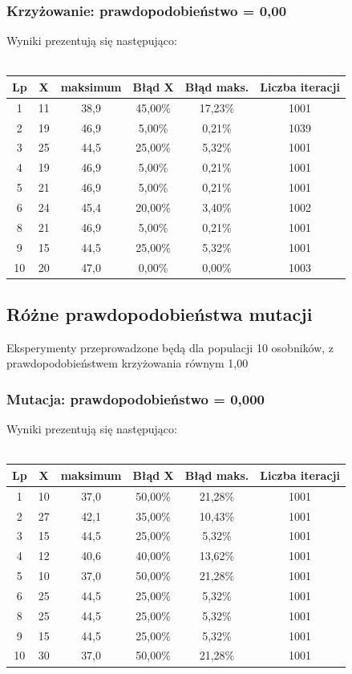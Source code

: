 \documentclass[a4paper,11pt]{article}
\begin{document}
				\subsubsection{Krzyżowanie: prawdopodobieństwo = 0,00}
					Wyniki prezentują się następująco:\\~\\
					\begin{tabular}{|c|c|c|c|c|c|}
						\hline 
						Lp & X & maksimum & Błąd X & Błąd maks. & Liczba iteracji\\
						\hline
						1 & 11 & 38,9 & 45,00\% & 17,23\% & 1001 \\\hline
						2 & 19 & 46,9 & 5,00\% & 0,21\%& 1039 \\\hline
						3 & 25 & 44,5 & 25,00\% &5,32\% &1001 \\\hline
						4 & 19 & 46,9 & 5,00\% &0,21\% &1001 \\\hline
						5 & 21 & 46,9 & 5,00\% &0,21\% &1001 \\\hline
						6 & 24 & 45,4 & 20,00\% &3,40\% &1002 \\\hline
						8 & 21 & 46,9 & 5,00\% &0,21\% &1001 \\\hline
						9 & 15 & 44,5 & 25,00\% & 5,32\%&1001 \\\hline
						10 & 20 & 47,0 & 0,00\% & 0,00\%&1003 \\\hline
					\end{tabular} 
			\subsection{Różne prawdopodobieństwa mutacji}
				Eksperymenty przeprowadzone będą dla populacji 10 osobników, z prawdopodobieństwem krzyżowania równym 1,00
				\subsubsection{Mutacja: prawdopodobieństwo = 0,000}
					Wyniki prezentują się następująco:\\~\\
					\begin{tabular}{|c|c|c|c|c|c|}
						\hline 
						Lp & X & maksimum & Błąd X & Błąd maks. & Liczba iteracji\\
						\hline
						1 & 10 & 37,0 & 50,00\% &21,28\% &1001 \\\hline
						2 & 27 & 42,1 & 35,00\% &10,43\% &1001 \\\hline
						3 & 15 & 44,5 & 25,00\% &5,32\% &1001 \\\hline
						4 & 12 & 40,6 & 40,00\% &13,62\% &1001 \\\hline
						5 & 10 & 37,0 & 50,00\% &21,28\% &1001 \\\hline
						6 & 25 & 44,5 & 25,00\% &5,32\% &1001 \\\hline
						8 & 25 & 44,5 & 25,00\% & 5,32\%&1001 \\\hline
						9 & 15 & 44,5 & 25,00\% & 5,32\%&1001 \\\hline
						10 & 30 & 37,0 & 50,00\% & 21,28\%&1001 \\\hline
					\end{tabular} 
\end{document}
